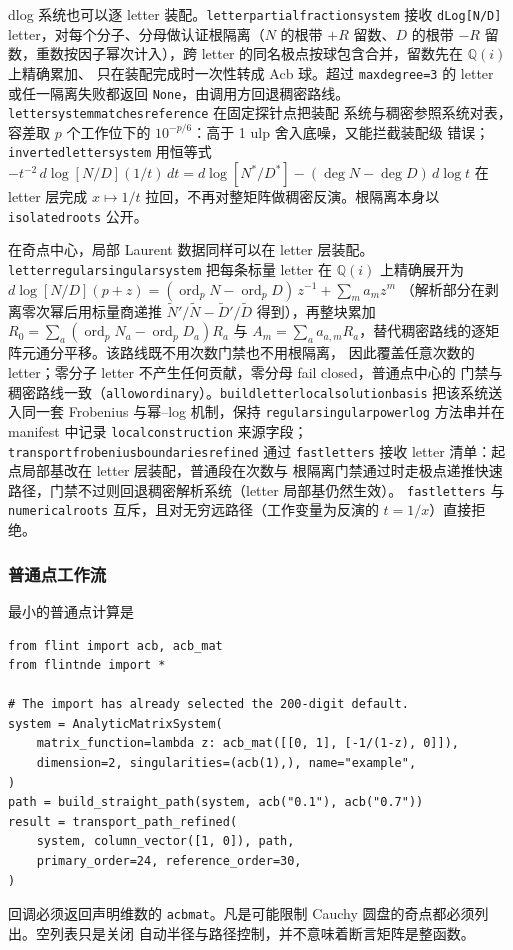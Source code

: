 \documentclass[11pt,a4paper]{ctexart}
\renewcommand{\_}{\origunderscore\allowbreak}
\begin{document}
dlog 系统也可以逐 letter 装配。\texttt{letter\_partial\_fraction\_system} 接收
\texttt{dLog[N/D]} letter，对每个分子、分母做认证根隔离（$N$ 的根带 $+R$ 留数、$D$ 的根带 $-R$
留数，重数按因子幂次计入），跨 letter 的同名极点按球包含合并，留数先在 $\mathbb Q(i)$ 上精确累加、
只在装配完成时一次性转成 Acb 球。超过 \texttt{max\_degree=3} 的 letter 或任一隔离失败都返回
\texttt{None}，由调用方回退稠密路线。\texttt{letter\_system\_matches\_reference} 在固定探针点把装配
系统与稠密参照系统对表，容差取 $p$ 个工作位下的 $10^{-p/6}$：高于 1 ulp 舍入底噪，又能拦截装配级
错误；\texttt{inverted\_letter\_system} 用恒等式
$-t^{-2}\,d\log[N/D](1/t)\,dt=d\log[N^{*}/D^{*}]-(\deg N-\deg D)\,d\log t$ 在 letter 层完成
$x\mapsto1/t$ 拉回，不再对整矩阵做稠密反演。根隔离本身以 \texttt{isolated\_roots} 公开。

在奇点中心，局部 Laurent 数据同样可以在 letter 层装配。
\texttt{letter\_regular\_singular\_system} 把每条标量 letter 在 $\mathbb Q(i)$ 上精确展开为
$d\log[N/D](p+z)=(\operatorname{ord}_pN-\operatorname{ord}_pD)\,z^{-1}+\sum_ma_mz^m$
（解析部分在剥离零次幂后用标量商递推 $\tilde N'/\tilde N-\tilde D'/\tilde D$ 得到），再整块累加
$R_0=\sum_a(\operatorname{ord}_pN_a-\operatorname{ord}_pD_a)R_a$ 与
$A_m=\sum_aa_{a,m}R_a$，替代稠密路线的逐矩阵元通分平移。该路线既不用次数门禁也不用根隔离，
因此覆盖任意次数的 letter；零分子 letter 不产生任何贡献，零分母 fail closed，普通点中心的
门禁与稠密路线一致（\texttt{allow\_ordinary}）。\texttt{build\_letter\_local\_solution\_basis}
把该系统送入同一套 Frobenius 与幂--log 机制，保持
\texttt{regular\_singular\_power\_log} 方法串并在 manifest 中记录
\texttt{local\_construction} 来源字段；\texttt{transport\_frobenius\_boundaries\_refined}
通过 \texttt{fast\_letters} 接收 letter 清单：起点局部基改在 letter 层装配，普通段在次数与
根隔离门禁通过时走极点递推快速路径，门禁不过则回退稠密解析系统（letter 局部基仍然生效）。
\texttt{fast\_letters} 与 \texttt{numerical\_roots} 互斥，且对无穷远路径（工作变量为反演的
$t=1/x$）直接拒绝。

\subsubsection{普通点工作流}
\label{subsec:transport-api}

最小的普通点计算是
\begin{verbatim}
from flint import acb, acb_mat
from flintnde import *

# The import has already selected the 200-digit default.
system = AnalyticMatrixSystem(
    matrix_function=lambda z: acb_mat([[0, 1], [-1/(1-z), 0]]),
    dimension=2, singularities=(acb(1),), name="example",
)
path = build_straight_path(system, acb("0.1"), acb("0.7"))
result = transport_path_refined(
    system, column_vector([1, 0]), path,
    primary_order=24, reference_order=30,
)
\end{verbatim}
回调必须返回声明维数的 \texttt{acb\_mat}。凡是可能限制 Cauchy 圆盘的奇点都必须列出。空列表只是关闭
自动半径与路径控制，并不意味着断言矩阵是整函数。
\end{document}
